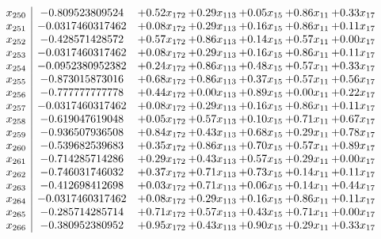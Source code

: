 \documentclass[8pt]{article}
\begin{document}
\[\begin{array}{c| c c@{\hskip 2pt} c@{\hskip 2pt} c@{\hskip 2pt} c@{\hskip 2pt} c@{\hskip 2pt} }
 x_{250}   &  -0.809523809524 & +  0.52 x_{172} & +  0.29 x_{113} & +  0.05 x_{15} & +  0.86 x_{11} & +  0.33 x_{17}\\
 x_{251}   &  -0.0317460317462 & +  0.08 x_{172} & +  0.29 x_{113} & +  0.16 x_{15} & +  0.86 x_{11} & +  0.11 x_{17}\\
 x_{252}   &  -0.428571428572 & +  0.57 x_{172} & +  0.86 x_{113} & +  0.14 x_{15} & +  0.57 x_{11} & +  0.00 x_{17}\\
 x_{253}   &  -0.0317460317462 & +  0.08 x_{172} & +  0.29 x_{113} & +  0.16 x_{15} & +  0.86 x_{11} & +  0.11 x_{17}\\
 x_{254}   &  -0.0952380952382 & +  0.24 x_{172} & +  0.86 x_{113} & +  0.48 x_{15} & +  0.57 x_{11} & +  0.33 x_{17}\\
 x_{255}   &  -0.873015873016 & +  0.68 x_{172} & +  0.86 x_{113} & +  0.37 x_{15} & +  0.57 x_{11} & +  0.56 x_{17}\\
 x_{256}   &  -0.777777777778 & +  0.44 x_{172} & +  0.00 x_{113} & +  0.89 x_{15} & +  0.00 x_{11} & +  0.22 x_{17}\\
 x_{257}   &  -0.0317460317462 & +  0.08 x_{172} & +  0.29 x_{113} & +  0.16 x_{15} & +  0.86 x_{11} & +  0.11 x_{17}\\
 x_{258}   &  -0.619047619048 & +  0.05 x_{172} & +  0.57 x_{113} & +  0.10 x_{15} & +  0.71 x_{11} & +  0.67 x_{17}\\
 x_{259}   &  -0.936507936508 & +  0.84 x_{172} & +  0.43 x_{113} & +  0.68 x_{15} & +  0.29 x_{11} & +  0.78 x_{17}\\
 x_{260}   &  -0.539682539683 & +  0.35 x_{172} & +  0.86 x_{113} & +  0.70 x_{15} & +  0.57 x_{11} & +  0.89 x_{17}\\
 x_{261}   &  -0.714285714286 & +  0.29 x_{172} & +  0.43 x_{113} & +  0.57 x_{15} & +  0.29 x_{11} & +  0.00 x_{17}\\
 x_{262}   &  -0.746031746032 & +  0.37 x_{172} & +  0.71 x_{113} & +  0.73 x_{15} & +  0.14 x_{11} & +  0.11 x_{17}\\
 x_{263}   &  -0.412698412698 & +  0.03 x_{172} & +  0.71 x_{113} & +  0.06 x_{15} & +  0.14 x_{11} & +  0.44 x_{17}\\
 x_{264}   &  -0.0317460317462 & +  0.08 x_{172} & +  0.29 x_{113} & +  0.16 x_{15} & +  0.86 x_{11} & +  0.11 x_{17}\\
 x_{265}   &  -0.285714285714 & +  0.71 x_{172} & +  0.57 x_{113} & +  0.43 x_{15} & +  0.71 x_{11} & +  0.00 x_{17}\\
 x_{266}   &  -0.380952380952 & +  0.95 x_{172} & +  0.43 x_{113} & +  0.90 x_{15} & +  0.29 x_{11} & +  0.33 x_{17}\\

\end{array}\]
\end{document}
